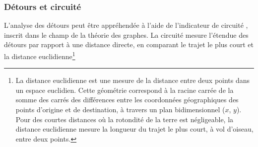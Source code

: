 \begin{refsegment}
\subsubsection*{Détours et circuité
    \label{chap5:detours-circuite}
    }

L'analyse des détours peut être appréhendée à l'aide de l'indicateur de circuité \textcolor{blue}{\autocite[1949]{barrington-leigh_global_2020}}, inscrit dans le champ de la théorie des graphes. La circuité mesure l'étendue des détours par rapport à une distance directe, en comparant le trajet le plus court et la distance euclidienne\footnote{
La distance euclidienne est une mesure de la distance entre deux points dans un espace euclidien. Cette géométrie correspond à la racine carrée de la somme des carrés des différences entre les coordonnées géographiques des points d'origine et de destination, à travers un plan bidimensionnel (\(x\), \(y\)). Pour des courtes distances où la rotondité de la terre est négligeable, la distance euclidienne mesure la longueur du trajet le plus court, à vol d'oiseau, entre deux points.
}
\end{refsegment}
